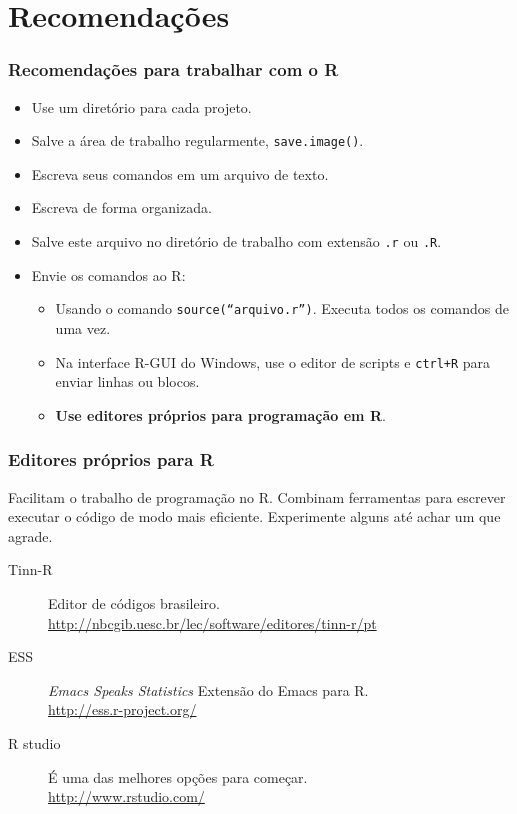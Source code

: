 \documentclass[handout]{beamer}
\begin{document}
\section{Recomendações}
\begin{frame}
  \frametitle{Recomendações para trabalhar com o R}
  \begin{itemize}
    \item Use um diretório para cada projeto.
      \item Salve a área de trabalho regularmente, \texttt{save.image()}.
      \item Escreva seus comandos em um arquivo de texto.
      \item Escreva de forma organizada.
      \item Salve este arquivo no diretório de trabalho com extensão \texttt{.r} ou \texttt{.R}.
      \item Envie os comandos ao R:
        \begin{itemize}
         \item Usando o comando \texttt{source(``arquivo.r'')}. Executa todos os comandos de uma vez.
         \item Na interface R-GUI do Windows, use o editor de scripts e \texttt{ctrl+R} para enviar linhas ou blocos.
         \item \textbf{ Use editores próprios para programação em R}.
        \end{itemize}
  \end{itemize}
\end{frame}
\begin{frame}
  \frametitle{Editores próprios para R}
  
     Facilitam o trabalho de programação no R. Combinam ferramentas para escrever executar o código de modo mais eficiente. Experimente alguns até achar um que agrade.

     \begin{description}
     \item[Tinn-R] Editor de códigos brasileiro.\\
       \url{http://nbcgib.uesc.br/lec/software/editores/tinn-r/pt}\\
           \item[ESS] \textit{Emacs Speaks Statistics}  Extensão do Emacs para R.\\
             \url{http://ess.r-project.org/}\\
           \item[R studio] É uma das melhores opções para começar. \\
                 \url {http://www.rstudio.com/} 
     \end{description}
   \end{frame}
\end{document}
